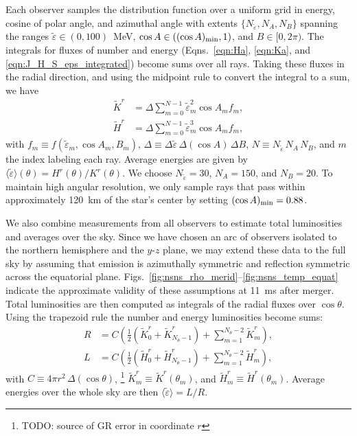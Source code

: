 \documentclass[aps,floatfix,prd,superscriptaddress,twocolumn]{revtex4-1}
\begin{document}
Each observer samples the distribution function over a uniform grid
in energy, cosine of polar angle, and azimuthal angle with extents
$\{N_{\tilde{\varepsilon}},N_A, N_B\}$ spanning the ranges
$\tilde{\varepsilon}\in(0,100)$~MeV,
$\cos A\in\left((\cos A)_{\rm min}, 1\right)$, and
$B\in[0,2\pi)$.
The integrals for fluxes of number and energy
(Eqns.~\ref{eqn:Ha}, \ref{eqn:Ka}, and \ref{eqn:J_H_S_eps_integrated})
become sums over all rays.
Taking these fluxes in the radial direction,
and using the midpoint rule to convert the integral to a sum, we have
\begin{align}
  \label{eqn:Kr_minkowski}
  \tilde{K}^r &= \Delta
  \sum\limits_{m=0}^{N-1}
  \tilde{\varepsilon}_m^2 \cos A_m f_m,\\
  \label{eqn:Hr_minkowski}
  \tilde{H}^r &= \Delta
  \sum\limits_{m=0}^{N-1}
  \tilde{\varepsilon}_m^3 \cos A_m f_m,
\end{align}
with $f_m \equiv f(\tilde{\varepsilon}_m,\cos A_m, B_m)$,
$\Delta \equiv \Delta\tilde{\varepsilon}\, \Delta(\cos A)\, \Delta B$,
$N \equiv N_{\tilde{\varepsilon}}\, N_A\, N_B$,
and $m$ the index labeling each ray.
Average energies are given by
$\langle\tilde{\varepsilon}\rangle(\theta)=H^r(\theta)/K^r(\theta)$.
We choose $N_{\tilde{\varepsilon}}=30$, $N_A=150$, and $N_B=20$.
To maintain high angular resolution, we only sample rays that pass within
approximately 120~km of the star's center by setting $(\cos A)_{\rm min}=0.88$.

We also combine measurements from all observers to estimate
total luminosities and averages over the sky.
Since we have chosen an arc of observers isolated to the northern hemisphere and
the $y$-$z$ plane, we may extend these data to the full sky by assuming that
emission is azimuthally symmetric and reflection symmetric across the
equatorial plane. Figs.~\ref{fig:nsns_rho_merid}--\ref{fig:nsns_temp_equat}
indicate the approximate validity of these assumptions at 11~ms after merger.
Total luminosities are then computed as integrals of the radial fluxes
over $\cos\theta$.
Using the trapezoid rule the number and energy luminosities become sums:
\begin{align}
  \label{eqn:luminosity_R}
  R &= C
  \left(\frac{1}{2}(\tilde{K}^r_0+\tilde{K}^r_{N_\theta-1})
  +\sum\limits_{m=1}^{N_\theta-2}\tilde{K}^r_m\right),\\
  \label{eqn:luminosity_L}
  L &= C
  \left(\frac{1}{2}(\tilde{H}^r_0+\tilde{H}^r_{N_\theta-1})
  +\sum\limits_{m=1}^{N_\theta-2}\tilde{H}^r_m\right),
\end{align}
with $C \equiv 4\pi r^2\, \Delta(\cos \theta)$,
\footnote{TODO: source of GR error in coordinate $r$}
$\tilde{K}^r_m \equiv \tilde{K}^r(\theta_m)$, and
$\tilde{H}^r_m \equiv \tilde{H}^r(\theta_m)$.
Average energies over the whole sky are then
$\langle\tilde{\varepsilon}\rangle=L/R$.
\end{document}
